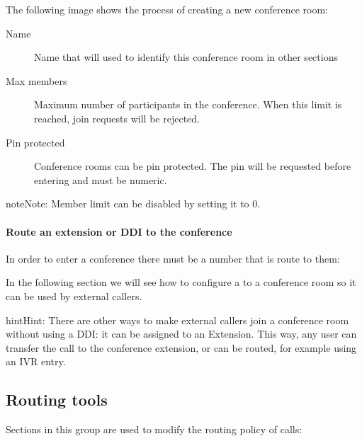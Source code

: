 \documentclass[letterpaper,10pt,english]{sphinxmanual}
\begin{document}
The following image shows the process of creating a new conference room:
\begin{description}
\item[{Name}] \leavevmode{}\label{administration_portal/client/vpbx/routing_endpoints/conference_rooms:term-name}
Name that will used to identify this conference room in other sections

\item[{Max members}] \leavevmode{}\label{administration_portal/client/vpbx/routing_endpoints/conference_rooms:term-max-members}
Maximum number of participants in the conference. When this limit is
reached, join requests will be rejected.

\item[{Pin protected}] \leavevmode{}\label{administration_portal/client/vpbx/routing_endpoints/conference_rooms:term-pin-protected}
Conference rooms can be pin protected. The pin will be requested before
entering and must be numeric.

\end{description}

\begin{notice}{note}{Note:}
Member limit can be disabled by setting it to 0.
\end{notice}
\paragraph{Route an extension or DDI to the conference}

In order to enter a conference there must be a number that is route to them:

In the following section we will see how to configure a {\hyperref[administration_portal/client/vpbx/ddis:ddis]{}} to a conference room so it can be used by external callers.

\begin{notice}{hint}{Hint:}
There are other ways to make external callers join a conference room
without using a DDI: it can be assigned to an Extension. This way, any user
can transfer the call to the conference extension, or can be routed, for
example using an IVR entry.
\end{notice}


\subsection{Routing tools}
\label{administration_portal/client/vpbx/routing_tools/index::doc}\label{administration_portal/client/vpbx/routing_tools/index:routing-tools}
Sections in this group are used to modify the routing policy of calls:
\end{document}
